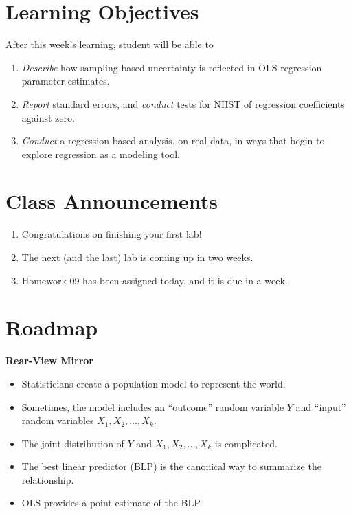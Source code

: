 \documentclass[
  letterpaper,
  DIV=11,
  numbers=noendperiod]{scrreprt}
\providecommand{\tightlist}{%
  \setlength{\itemsep}{0pt}\setlength{\parskip}{0pt}}\usepackage{longtable,booktabs,array}
\begin{document}
\section{Learning Objectives}\label{learning-objectives-8}

After this week's learning, student will be able to

\begin{enumerate}
\def\labelenumi{\arabic{enumi}.}
\tightlist
\item
  \emph{Describe} how sampling based uncertainty is reflected in OLS
  regression parameter estimates.
\item
  \emph{Report} standard errors, and \emph{conduct} tests for NHST of
  regression coefficients against zero.
\item
  \emph{Conduct} a regression based analysis, on real data, in ways that
  begin to explore regression as a modeling tool.
\end{enumerate}

\section{Class Announcements}\label{class-announcements-7}

\begin{enumerate}
\def\labelenumi{\arabic{enumi}.}
\tightlist
\item
  Congratulations on finishing your first lab!
\item
  The next (and the last) lab is coming up in two weeks.
\item
  Homework 09 has been assigned today, and it is due in a week.
\end{enumerate}

\section{Roadmap}\label{roadmap-5}

\textbf{Rear-View Mirror}

\begin{itemize}
\tightlist
\item
  Statisticians create a population model to represent the world.
\item
  Sometimes, the model includes an ``outcome'' random variable \(Y\) and
  ``input'' random variables \(X_1, X_2,...,X_k\).
\item
  The joint distribution of \(Y\) and \(X_1, X_2,...,X_k\) is
  complicated.
\item
  The best linear predictor (BLP) is the canonical way to summarize the
  relationship.
\item
  OLS provides a point estimate of the BLP
\end{itemize}
\end{document}

